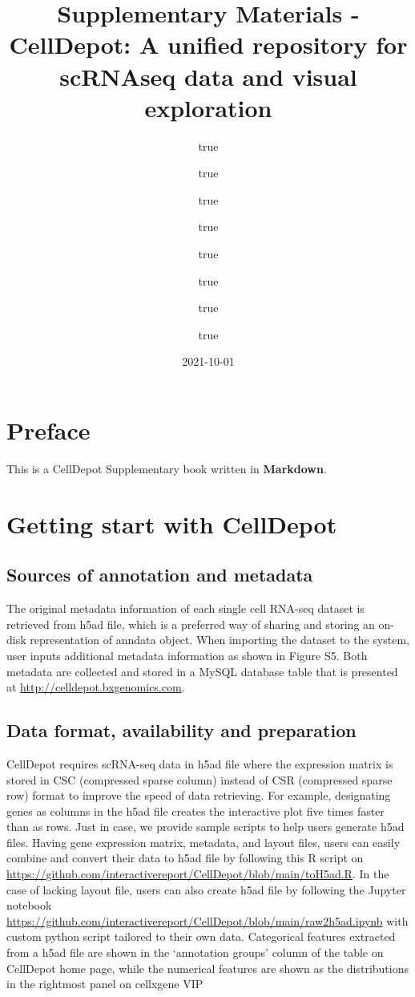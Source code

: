 \documentclass[
]{book}
\title{Supplementary Materials - CellDepot: A unified repository for scRNAseq data and visual exploration}
\author{true \and true \and true \and true \and true \and true \and true \and true}
\date{2021-10-01}
\begin{document}
\maketitle

{
\setcounter{tocdepth}{1}
\tableofcontents
}
\hypertarget{preface}{%
\chapter{Preface}\label{preface}}

This is a CellDepot Supplementary book written in \textbf{Markdown}.

\hypertarget{getting-start-with-celldepot}{%
\chapter{Getting start with CellDepot}\label{getting-start-with-celldepot}}

\hypertarget{sources-of-annotation-and-metadata}{%
\section{Sources of annotation and metadata}\label{sources-of-annotation-and-metadata}}

The original metadata information of each single cell RNA-seq dataset is retrieved from h5ad file, which is a preferred way of sharing and storing an on-disk representation of anndata object. When importing the dataset to the system, user inputs additional metadata information as shown in Figure S5. Both metadata are collected and stored in a MySQL database table that is presented at \url{http://celldepot.bxgenomics.com}.

\hypertarget{data-format-availability-and-preparation}{%
\section{Data format, availability and preparation}\label{data-format-availability-and-preparation}}

CellDepot requires scRNA-seq data in h5ad file where the expression matrix is stored in CSC (compressed sparse column) instead of CSR (compressed sparse row) format to improve the speed of data retrieving. For example, designating genes as columns in the h5ad file creates the interactive plot five times faster than as rows. Just in case, we provide sample scripts to help users generate h5ad files. Having gene expression matrix, metadata, and layout files, users can easily combine and convert their data to h5ad file by following this R script on \url{https://github.com/interactivereport/CellDepot/blob/main/toH5ad.R}. In the case of lacking layout file, users can also create h5ad file by following the Jupyter notebook \url{https://github.com/interactivereport/CellDepot/blob/main/raw2h5ad.ipynb} with custom python script tailored to their own data. Categorical features extracted from a h5ad file are shown in the `annotation groups' column of the table on CellDepot home page, while the numerical features are shown as the distributions in the rightmost panel on cellxgene VIP
\end{document}
